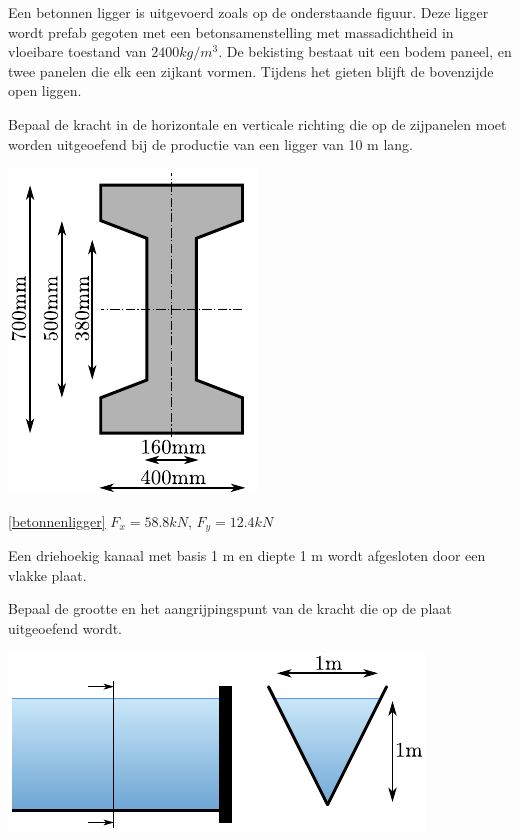 \begin{toepassing}[*]
	\label{betonnenligger}
Een betonnen ligger is uitgevoerd zoals op de onderstaande figuur. Deze ligger wordt prefab gegoten met een betonsamenstelling met massadichtheid in vloeibare toestand van $2400\unit{kg/m^3}$. De bekisting bestaat uit een bodem paneel, en twee panelen die elk een zijkant vormen. Tijdens het gieten blijft de bovenzijde open liggen.
		
Bepaal de kracht in de horizontale en verticale richting die op de zijpanelen moet worden uitgeoefend bij de productie van een ligger van 10 m lang.

	\centering
	\includegraphics{fig/hydrostatica/betonnenligger}
\end{toepassing}
\begin{antwoord}{\ref{betonnenligger}}
	$F_x = 58.8\unit{kN}$, $F_y = 12.4\unit{kN}$
\end{antwoord}
\begin{toepassing}
	\label{driehoekig_kanaal}
Een driehoekig kanaal met basis 1 m en diepte 1 m wordt afgesloten door een vlakke plaat.
		
Bepaal de grootte en het aangrijpingspunt van de kracht die op de plaat uitgeoefend wordt.

	\centering
	\includegraphics{fig/hydrostatica/driehoekig_kanaal}
\end{toepassing}
